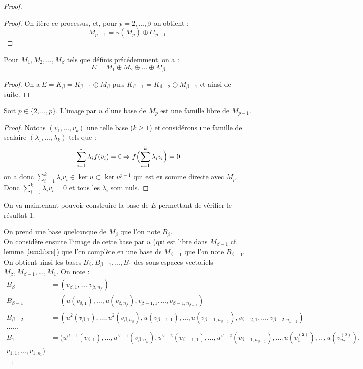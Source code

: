 \documentclass{article}
\begin{document}
\begin{proof}
\begin{proof}
On itère ce processus, et, pour $p=2, \dots, \beta$ on obtient :
\[ M_{p-1} = u(M_{p}) \oplus G_{p-1} . \]
\end{proof}

\begin{lem}
\label{lem:somme}
Pour $M_1, M_2, \dots, M_{\beta}$ tels que définis précédemment, on a :
\[ E = M_1 \oplus M_2 \oplus \dots \oplus M_{\beta} \]
\end{lem}

\begin{proof}
On a $E = K_{\beta} = K_{\beta-1} \oplus M_{\beta}$ puis $K_{\beta-1} = K_{\beta-2} \oplus M_{\beta-1}$
et ainsi de suite.
\end{proof}

\begin{lem}
\label{lem:libre}
Soit $p \in \{2, \dots, p\}$. L'image par $u$ d'une base de $M_p$ est une famille libre de $M_{p-1}$.
\end{lem}

\begin{proof}
Notons $(v_1, \dots, v_k)$ une telle base ($k \geq 1$) et considérons une famille de scalaire $(\lambda_1, \dots, \lambda_k)$ tels que :
\[ \sum_{i=1}^k \lambda_i f(v_i) = 0 \Rightarrow f \Bigl(  \sum_{i=1}^k \lambda_i v_i  \Bigr) =0 \]
on a donc $\sum_{i=1}^k \lambda_i v_i  \in \ker{u} \subset \ker{u^{p-1}}$ qui est en somme directe avec $M_p$. 
Donc $\sum_{i=1}^k \lambda_i v_i = 0$ et tous les $\lambda_i$ sont nuls.
\end{proof}

On va maintenant pouvoir construire la base de $E$ permettant de vérifier le résultat 1. \newline

On prend une base quelconque de $M_{\beta}$ que l'on note $B_{\beta}$. \\
On considère ensuite l'image de cette base par $u$ (qui est libre dans $M_{\beta-1}$ cf. lemme $\ref{lem:libre}$)
que l'on complète en une base de $M_{\beta-1}$ que l'on note $B_{\beta-1}$. \\
On obtient ainsi les bases $B_{\beta}, B_{\beta-1}, \dots, B_1$ des sous-espaces vectoriels $M_{\beta}, M_{\beta-1}, \dots, M_1$.
On note :
\begin{align*}
B_{\beta} & = (v_{\beta, 1}, \dots, v_{\beta, n_{\beta}}) \\
B_{\beta-1} & = (u(v_{\beta, 1}), \dots, u(v_{\beta, n_{\beta}}), v_{\beta-1,1}, \dots, v_{\beta-1, n_{\beta-1}}) \\
B_{\beta-2} & = (u^2(v_{\beta, 1}), \dots, u^2(v_{\beta, n_{\beta}}), u(v_{\beta-1,1}), \dots, u(v_{\beta-1, n_{\beta-1}}), 
 v_{\beta-2,1}, \dots, v_{\beta-2, n_{\beta-2}}) \\
\dots \dots \\
B_1 & = (u^{\beta-1}(v_{\beta, 1}), \dots, u^{\beta-1}(v_{\beta, n_{\beta}}), 
u^{\beta-2}(v_{\beta-1,1}), \dots, u^{\beta-2}(v_{\beta-1, n_{\beta-1}}), \dots, 
u(v_1^{(2)}), \dots, u(v_{n_2}^{(2)}), \\
v_{1,1}, \dots, v_{1,n_1}) 
\end{align*}


\end{proof}
\end{document}
